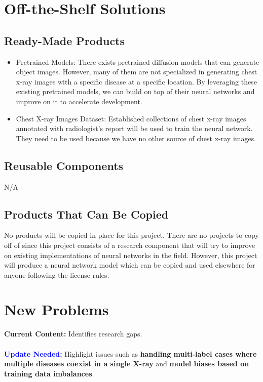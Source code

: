 \documentclass[12pt]{article}
\begin{document}
\section{Off-the-Shelf Solutions}
\subsection{Ready-Made Products}
\begin{itemize}
    \item Pretrained Models: There exists pretrained diffusion models that can generate object 
    images. However, many of them are not specialized in generating chest x-ray images with a 
    specific disease at a specific location. By leveraging these existing pretrained models, we 
    can build on top of their neural networks and improve on it to accelerate development.
    \item Chest X-ray Images Dataset: Established collections of chest x-ray images annotated with 
    radiologist’s report will be used to train the neural network. They need to be used because we 
    have no other source of chest x-ray images.
\end{itemize}
\subsection{Reusable Components}
N/A 

\subsection{Products That Can Be Copied}
No products will be copied in place for this project. There are no projects to copy off of since 
this project consists of a research component that will try to improve on existing implementations 
of neural networks in the field. However, this project will produce a neural network model which 
can be copied and used elsewhere for anyone following the license rules.


\section{New Problems}

\textbf{Current Content:} Identifies research gaps. \\
\\
\textbf{\textcolor{blue}{Update Needed:}} Highlight issues such as \textbf{handling multi-label cases where multiple diseases coexist in a single X-ray} and \textbf{model biases based on training data imbalances}.
\end{document}
